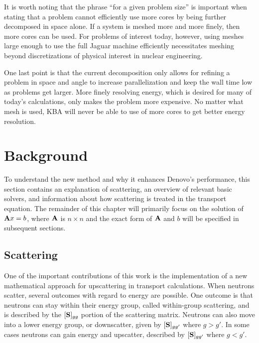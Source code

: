 It is worth noting that the phrase ``for a given problem size'' is important when stating that a problem cannot efficiently use more cores by being further decomposed in space alone. If a system is meshed more and more finely, then more cores can be used. For problems of interest today, however, using meshes large enough to use the full Jaguar machine efficiently necessitates meshing beyond discretizations of physical interest in nuclear engineering. 

One last point is that the current decomposition only allows for refining a problem in space and angle to increase parallelization and keep the wall time low as problems get larger. More finely resolving energy, which is desired for many of today's calculations, only makes the problem more expensive. No matter what mesh is used, KBA will never be able to use of more cores to get better energy resolution.

\section{Background}
To understand the new method and why it enhances Denovo's performance, this section contains an explanation of scattering, an overview of relevant basic solvers, and information about how scattering is treated in the transport equation. The remainder of this chapter will primarily focus on the solution of $\mathbf{A}x = b$, where $\mathbf{A}$ is $n \times n$  and the exact form of $\mathbf{A}$ and $b$ will be specified in subsequent sections.

\subsection{Scattering}
One of the important contributions of this work is the implementation of a new mathematical approach for upscattering in transport calculations. When neutrons scatter, several outcomes with regard to energy are possible. One outcome is that neutrons can stay within their energy group, called within-group scattering, and is described by the $[\mathbf{S}]_{gg}$ portion of the scattering matrix. Neutrons can also move into a lower energy group, or downscatter, given by $[\mathbf{S}]_{gg'}$ where $g > g'$. In some cases neutrons can gain energy and upscatter, described by $[\mathbf{S}]_{gg'}$ where $g < g'$. 

